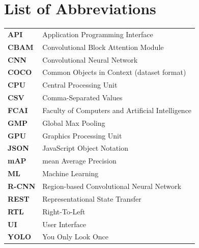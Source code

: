 \documentclass[12pt, a4paper]{report}
\begin{document}
\chapter*{List of Abbreviations}
\begin{singlespace}
\begin{table}[h]
    \centering
    \begin{tabular}{ll}
        \textbf{API} & Application Programming Interface \\
        \textbf{CBAM} & Convolutional Block Attention Module \\
        \textbf{CNN} & Convolutional Neural Network \\
        \textbf{COCO} & Common Objects in Context (dataset format) \\
        \textbf{CPU} & Central Processing Unit \\
        \textbf{CSV} & Comma-Separated Values \\
        \textbf{FCAI} & Faculty of Computers and Artificial Intelligence \\
        \textbf{GMP} & Global Max Pooling \\
        \textbf{GPU} & Graphics Processing Unit \\
        \textbf{JSON} & JavaScript Object Notation \\
        \textbf{mAP} & mean Average Precision \\
        \textbf{ML} & Machine Learning \\
        \textbf{R-CNN} & Region-based Convolutional Neural Network \\
        \textbf{REST} & Representational State Transfer \\
        \textbf{RTL} & Right-To-Left \\
        \textbf{UI} & User Interface \\
        \textbf{YOLO} & You Only Look Once \\
    \end{tabular}
\end{table}
\end{singlespace}
\newpage

\end{document}
